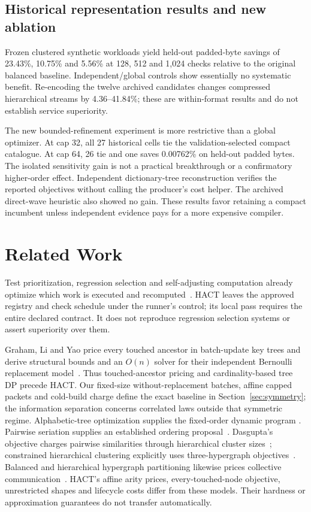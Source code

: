 \documentclass[10pt,journal,compsoc]{IEEEtran}
\theoremstyle{definition}\newtheorem{definition}[theorem]{Definition}
\begin{document}
\subsection{Historical representation results and new ablation}
Frozen clustered synthetic workloads yield held-out padded-byte savings of
23.43\%, 10.75\% and 5.56\% at 128, 512 and 1,024 checks relative to the
original balanced baseline. Independent/global controls show essentially
no systematic benefit. Re-encoding the twelve archived candidates changes
compressed hierarchical streams by 4.36--41.84\%; these are within-format
results and do not establish service superiority.

The new bounded-refinement experiment is more restrictive than a global
optimizer. At cap 32, all 27 historical cells tie the validation-selected
compact catalogue. At cap 64, 26 tie and one saves 0.00762\% on held-out
padded bytes. The isolated sensitivity gain is not a practical breakthrough
or a confirmatory higher-order effect. Independent dictionary-tree
reconstruction verifies the reported objectives without calling the
producer's cost helper. The archived direct-wave heuristic also showed
no gain. These results favor retaining a compact incumbent unless
independent evidence pays for a more expensive compiler.






\section{Related Work}\label{sec:jrelated}
Test prioritization, regression selection and self-adjusting computation
already optimize which work is executed and recomputed~\cite{rothermel,ekstazi,acar,build}.
HACT leaves the approved registry and check schedule under the runner's control; its local pass
requires the entire declared contract. It does not reproduce regression
selection systems or assert superiority over them.

Graham, Li and Yao price every touched ancestor in batch-update key trees
and derive structural bounds and an $O(n)$ solver for their independent
Bernoulli replacement model~\cite{graham2007}. Thus touched-ancestor
pricing and cardinality-based tree DP precede HACT. Our fixed-size
without-replacement batches, affine capped packets and cold-build charge
define the exact baseline in Section~\ref{sec:symmetry}; the information
separation concerns correlated laws outside that symmetric regime.
Alphabetic-tree optimization supplies the fixed-order dynamic program
\cite{alphabetic}. Pairwise seriation supplies an established ordering
proposal~\cite{atkins}. Dasgupta's objective charges pairwise similarities
through hierarchical cluster sizes~\cite{dasgupta}; constrained hierarchical
clustering explicitly uses three-hypergraph objectives~\cite{hyperhierarchy}.
Balanced and hierarchical hypergraph partitioning likewise prices collective
communication~\cite{hyperpartition}. HACT's affine arity prices, every-touched-node
objective, unrestricted shapes and lifecycle costs differ from these models.
Their hardness or approximation guarantees do not transfer automatically.
\end{document}

